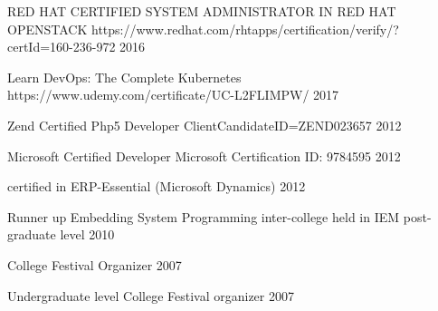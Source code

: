 

\cvsubsection{}


\begin{cvhonors}

  \cvhonor
    {RED HAT CERTIFIED SYSTEM ADMINISTRATOR IN RED HAT OPENSTACK} %
    {https://www.redhat.com/rhtapps/certification/verify/?certId=160-236-972} %
    {} %
    {2016} %

  \cvhonor
    {Learn DevOps: The Complete Kubernetes} %
    {https://www.udemy.com/certificate/UC-L2FLIMPW/} %
    {} %
    {2017} %

  \cvhonor
    {Zend Certified Php5 Developer} %
    {ClientCandidateID=ZEND023657} %
    {} %
    {2012} %

  \cvhonor
    {Microsoft Certified Developer} %
    {Microsoft Certification ID:  9784595} %
    {} %
    {2012} %

  \cvhonor
    {certified in ERP-Essential (Microsoft Dynamics)} %
    {} %
    {} %
    {2012} %

  \cvhonor
    {Runner up Embedding System Programming inter-college held in IEM post-graduate level} %
    {} %
    {} %
    {2010} %

  \cvhonor
    {College Festival Organizer} %
    {} %
    {} %
    {2007} %

  \cvhonor
    {Undergraduate level College Festival organizer} %
    {} %
    {} %
    {2007} %



\end{cvhonors}

